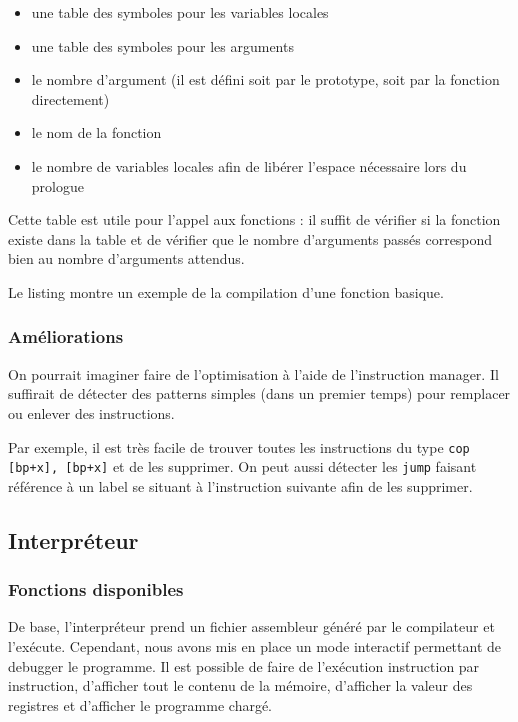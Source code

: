     \begin{itemize}
    \item une table des symboles pour les variables locales
    \item une table des symboles pour les arguments
    \item le nombre d'argument (il est défini soit par le prototype, soit par la fonction directement)
    \item le nom de la fonction
    \item le nombre de variables locales afin de libérer l'espace nécessaire lors du prologue
    \end{itemize}
    
    Cette table est utile pour l'appel aux fonctions : il suffit de vérifier si la fonction existe dans la table et de vérifier que le nombre d'arguments passés correspond bien au nombre d'arguments attendus.
    
    Le listing  montre un exemple de la compilation d'une fonction basique.
    
    \subsubsection{Améliorations}
    
        On pourrait imaginer faire de l'optimisation à l'aide de l'instruction manager. Il suffirait de détecter des patterns simples (dans un premier temps) pour remplacer ou enlever des instructions.
        
        Par exemple, il est très facile de trouver toutes les instructions du type \texttt{cop [bp+x], [bp+x]} et de les supprimer. On peut aussi détecter les \texttt{jump} faisant référence à un label se situant à l'instruction suivante afin de les supprimer.
    
\subsection{Interpréteur} \label{interpreteur}

    \subsubsection{Fonctions disponibles}
    
        De base, l'interpréteur prend un fichier assembleur généré par le compilateur et l'exécute. Cependant, nous avons mis en place un mode interactif permettant de debugger le programme. Il est possible de faire de l'exécution instruction par instruction, d'afficher tout le contenu de la mémoire, d'afficher la valeur des registres et d'afficher le programme chargé.
    
